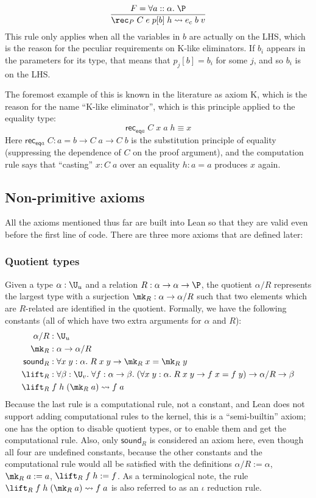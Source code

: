 $$\frac{F=\forall a::\alpha.\;\P}{\rec_P\;C\;e\;p[b]\;h\rightsquigarrow e_c\;b\;v}$$
This rule only applies when all the variables in $b$ are actually on the LHS, which is the reason for the peculiar requirements on K-like eliminators. If $b_i$ appears in the parameters for its type, that means that $p_j[b]=b_i$ for some $j$, and so $b_i$ is on the LHS. 

The foremost example of this is known in the literature as axiom K, which is the reason for the name ``K-like eliminator'', which is this principle applied to the equality type:
$$\mathsf{rec}_{\mathsf{eq}a}\;C\;x\;a\;h\equiv x$$
Here $\mathsf{rec}_{\mathsf{eq}a}\;C:a=b\to C\;a\to C\;b$ is the substitution principle of equality (suppressing the dependence of $C$ on the proof argument), and the computation rule says that ``casting'' $x:C\;a$ over an equality $h:a=a$ produces $x$ again.
%
\subsection{Non-primitive axioms}

All the axioms mentioned thus far are built into Lean so that they are valid even before the first line of code. There are three more axioms that are defined later:

\subsubsection{Quotient types}
Given a type $\alpha:\U_u$ and a relation $R:\alpha\to\alpha\to\P$, the quotient $\alpha/R$ represents the largest type with a surjection $\mk_R:\alpha\to\alpha/R$ such that two elements which are $R$-related are identified in the quotient. Formally, we have the following constants (all of which have two extra arguments for $\alpha$ and $R$):
\begin{align*}
\alpha/R&:\U_u\\
\mk_R&:\alpha\to\alpha/R\\
\mathsf{sound}_R&:\forall x\;y:\alpha.\;R\;x\;y\to \mk_R\;x=\mk_R\;y\\
\lift_R&:\forall\beta:\U_v.\;\forall f:\alpha\to\beta.\;(\forall x\;y:\alpha.\;R\;x\;y\to f\;x=f\;y)\to \alpha/R\to\beta\\
\lift_R&\;f\;h\;(\mk_R\;a)\rightsquigarrow f\;a
\end{align*}
Because the last rule is a computational rule, not a constant, and Lean does not support adding computational rules to the kernel, this is a ``semi-builtin'' axiom; one has the option to disable quotient types, or to enable them and get the computational rule. Also, only $\mathsf{sound}_R$ is considered an axiom here, even though all four are undefined constants, because the other constants and the computational rule would all be satisfied with the definitions $\alpha/R:=\alpha$, $\mk_R\;a:=a$, $\lift_R\;f\;h:=f$. As a terminological note, the rule $\lift_R\;f\;h\;(\mk_R\;a)\rightsquigarrow f\;a$ is also referred to as an $\iota$ reduction rule.

